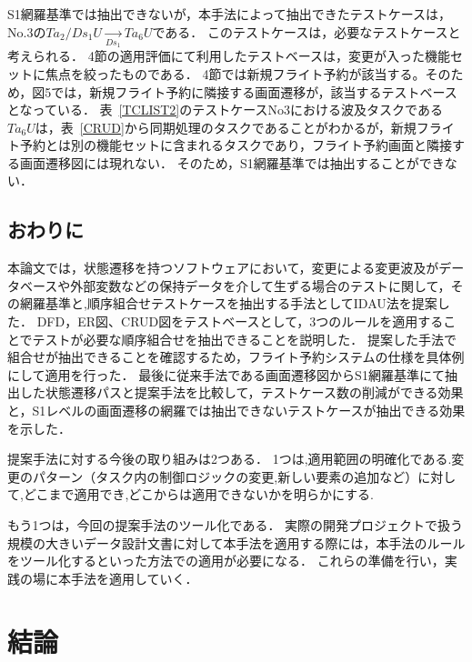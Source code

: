 \documentclass[a4paper,12pt]{jreport}
\begin{document}
S1網羅基準では抽出できないが，本手法によって抽出できたテストケースは，No.3の$Ta_2/Ds_1U  \xrightarrow[Ds_1]{} Ta_6U$である．
このテストケースは，必要なテストケースと考えられる．
4節の適用評価にて利用したテストベースは，変更が入った機能セットに焦点を絞ったものである．
4節では新規フライト予約が該当する。そのため，図5では，新規フライト予約に隣接する画面遷移が，該当するテストベースとなっている．
表~\ref{TCLIST2}のテストケースNo3における波及タスクである$Ta_6U$は，表~\ref{CRUD}から同期処理のタスクであることがわかるが，新規フライト予約とは別の機能セットに含まれるタスクであり，フライト予約画面と隣接する画面遷移図には現れない．
そのため，S1網羅基準では抽出することができない．

\section{おわりに}

本論文では，状態遷移を持つソフトウェアにおいて，変更による変更波及がデータベースや外部変数などの保持データを介して生ずる場合のテストに関して，その網羅基準と,順序組合せテストケースを抽出する手法としてIDAU法を提案した．
DFD，ER図、CRUD図をテストベースとして，3つのルールを適用することでテストが必要な順序組合せを抽出できることを説明した．
提案した手法で組合せが抽出できることを確認するため，フライト予約システムの仕様を具体例にして適用を行った．
最後に従来手法である画面遷移図からS1網羅基準にて抽出した状態遷移パスと提案手法を比較して，テストケース数の削減ができる効果と，S1レベルの画面遷移の網羅では抽出できないテストケースが抽出できる効果を示した．

提案手法に対する今後の取り組みは2つある．
1つは,適用範囲の明確化である.変更のパターン（タスク内の制御ロジックの変更,新しい要素の追加など）に対して,どこまで適用でき,どこからは適用できないかを明らかにする.

もう1つは，今回の提案手法のツール化である．
実際の開発プロジェクトで扱う規模の大きいデータ設計文書に対して本手法を適用する際には，本手法のルールをツール化するといった方法での適用が必要になる．
これらの準備を行い，実践の場に本手法を適用していく．

\chapter{結論}



% 


\end{document}
